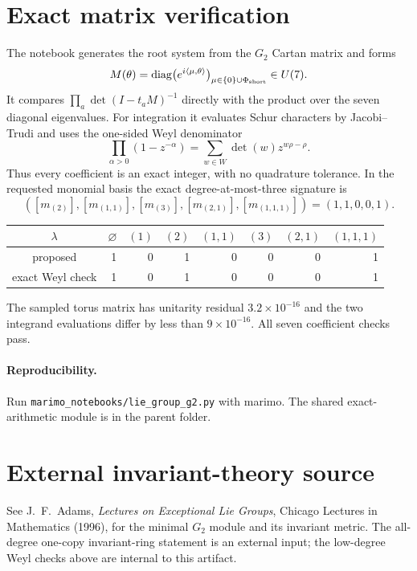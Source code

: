 \documentclass[10pt]{article}
\begin{document}
\section{Exact matrix verification}
The notebook generates the root system from the $G_2$ Cartan matrix and forms
\[
 M(\theta)=\operatorname{diag}\bigl(e^{i\langle\mu,\theta\rangle}\bigr)_{
 \mu\in\{0\}\cup\Phi_{\rm short}}\in U(7).
\]
It compares $\prod_a\det(I-t_aM)^{-1}$ directly with the product over the
seven diagonal eigenvalues.  For integration it evaluates Schur characters by
Jacobi--Trudi and uses the one-sided Weyl denominator
\[
 \prod_{\alpha>0}(1-z^{-\alpha})
 =\sum_{w\in W}\det(w)z^{w\rho-\rho}.
\]
Thus every coefficient is an exact integer, with no quadrature tolerance.
In the requested monomial basis the exact degree-at-most-three signature is
\[
([m_{(2)}],[m_{(1,1)}],[m_{(3)}],[m_{(2,1)}],[m_{(1,1,1)}])
=(1,1,0,0,1).
\]

\begin{center}\small
\begin{tabular}{@{}c|rrrrrrr@{}}\toprule
$\lambda$&$\varnothing$&$(1)$&$(2)$&$(1,1)$&$(3)$&$(2,1)$&$(1,1,1)$\\\midrule
proposed&1&0&1&0&0&0&1\\
exact Weyl check&1&0&1&0&0&0&1\\\bottomrule
\end{tabular}
\end{center}
The sampled torus matrix has unitarity residual $3.2\times10^{-16}$ and the
two integrand evaluations differ by less than $9\times10^{-16}$.  All seven
coefficient checks pass.

\paragraph{Reproducibility.}
Run \texttt{marimo\_notebooks/lie\_group\_g2.py} with marimo.  The shared exact-arithmetic
module is in the parent folder.

\section*{External invariant-theory source}
See J.~F.~Adams, \emph{Lectures on Exceptional Lie Groups}, Chicago
Lectures in Mathematics (1996), for the minimal $G_2$ module and its invariant
metric.  The all-degree one-copy invariant-ring statement is an external
input; the low-degree Weyl checks above are internal to this artifact.
\end{document}

